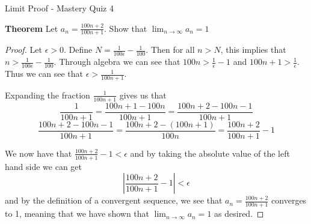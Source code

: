 Limit Proof - Mastery Quiz 4

\textbf{Theorem}
Let $a_n = \frac{100n + 2}{100n +1}$. Show that $\lim_{n\to\infty} a_n = 1$

\begin{proof}
Let $\epsilon > 0$. Define $N = \frac{1}{100\epsilon} - \frac{1}{100}$. Then for all $n> N$, this implies that $n >  \frac{1}{100\epsilon} - \frac{1}{100}$. Through algebra we can see that $100n > \frac{1}{\epsilon} -1$ and $100n + 1 > \frac{1}{\epsilon} $. Thus we can see that $\epsilon > \frac{1}{100n + 1}$. 

Expanding the fraction $\frac{1}{100n + 1}$ gives us that $$\frac{1}{100n + 1} = \frac{100n + 1 -100n}{100n + 1} = \frac{100n +2 -100n - 1}{100n + 1}$$
$$ \frac{100n +2 -100n - 1}{100n + 1} = \frac{100n + 2 - (100n + 1)}{100n} = \frac{100n +2}{100n + 1} - 1$$

We now have that $\frac{100n +2}{100n + 1} - 1 < \epsilon$ and by taking the absolute value of the left hand side we can get $$|\frac{100n +2}{100n + 1} - 1| < \epsilon$$
and by the definition of a convergent sequence, we see that $a_n = \frac{100n + 2}{100n +1}$ converges to 1, meaning that we have shown that $\lim_{n\to\infty} a_n = 1$ as desired.
\end{proof}